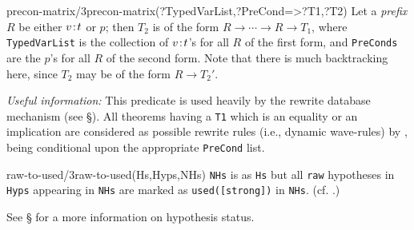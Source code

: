 \begin{predicate}{precon-matrix/3}{precon-matrix(?TypedVarList,?PreCond=>?T1,?T2)}%
Let a {\em prefix\/} $R$ be either $\Ty v:t$ or $p$; then $T_2$ is of the
form $R\rightarrow\cdots\rightarrow R\rightarrow T_1$, where {\tt
TypedVarList} is the collection of $\Ty v:t$'s for all $R$ of the first
form, and {\tt PreConds} are the $p$'s for all $R$ of the second form.
Note that there is much backtracking here, since $T_2$ may be of the form
$R\rightarrow T_2'$.  

{\sl Useful information:\/} This predicate is used heavily by the
rewrite database mechanism (see \S{}).  All theorems
having a {\tt T1} which is an equality or an implication are
considered as possible rewrite rules (i.e., dynamic wave-rules) by
, being conditional upon the appropriate {\tt PreCond}
list.

\end{predicate}

\begin{predicate}{raw-to-used/3}{raw-to-used(Hs,Hyps,NHs)}%
{\tt NHs} is as {\tt Hs} but all {\tt raw} hypotheses in {\tt Hyps}
appearing in {\tt NHs} are marked as {\tt used([strong])} in {\tt NHs}.
(cf. .)

See \S{} for a more information on hypothesis
status.
\end{predicate}

